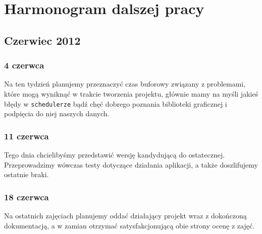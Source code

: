 \chapter{Harmonogram dalszej pracy}
\section{Czerwiec 2012}
\subsection{4 czerwca}
Na ten tydzień planujemy przeznaczyć czas buforowy związany z problemami, które mogą wyniknąć w trakcie tworzenia
projektu, głównie mamy na myśli jakieś błędy w \texttt{schedulerze} bądź chęć dobrego poznania biblioteki
graficznej i podpięcia do niej naszych danych.

\subsection{11 czerwca}
Tego dnia chcielibyśmy przedstawić wersję kandydującą do ostatecznej. Przeprowadzimy wówczas testy dotyczące działania
aplikacji, a także doszlifujemy ostatnie braki.

\subsection{18 czerwca}
Na ostatnich zajęciach planujemy oddać działający projekt wraz z dokończoną dokumentacją, a w zamian otrzymać
satysfakcjonującą obie strony ocenę z zajęć.